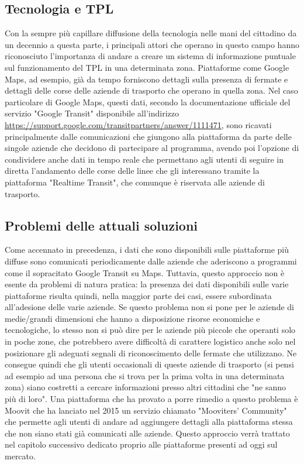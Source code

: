     \subsection{Tecnologia e TPL}
    Con la sempre più capillare diffusione della tecnologia nelle mani del cittadino da un decennio a questa parte, i principali attori che operano in questo campo hanno riconosciuto l'importanza di andare a creare un sistema di informazione puntuale sul funzionamento del TPL in una determinata zona. Piattaforme come Google Maps, ad esempio, già da tempo forniscono dettagli sulla presenza di fermate e dettagli delle corse delle aziende di trasporto che operano in quella zona. 
    Nel caso particolare di Google Maps, questi dati, secondo la documentazione ufficiale del servizio "Google Transit" disponibile all'indirizzo \url{https://support.google.com/transitpartners/answer/1111471}, sono ricavati principalmente dalle comunicazioni che giungono alla piattaforma da parte delle singole aziende che decidono di partecipare al programma, avendo poi l'opzione di condividere anche dati in tempo reale che permettano agli utenti di seguire in diretta l'andamento delle corse delle linee che gli interessano tramite la piattaforma "Realtime Transit", che comunque è riservata alle aziende di trasporto.

    \subsection{Problemi delle attuali soluzioni}
    Come accennato in precedenza, i dati che sono disponibili sulle piattaforme più diffuse sono comunicati periodicamente dalle aziende che aderiscono a programmi come il sopracitato Google Transit su Maps. 
    Tuttavia, questo approccio non è esente da problemi di natura pratica: la presenza dei dati disponibili sulle varie piattaforme risulta quindi, nella maggior parte dei casi, essere subordinata all'adesione delle varie aziende. Se questo problema non si pone per le aziende di medie/grandi dimensioni che hanno a disposizione risorse economiche e tecnologiche, lo stesso non si può dire per le aziende più piccole che operanti solo in poche zone, che potrebbero avere difficoltà di carattere logistico anche solo nel posizionare gli adeguati segnali di riconoscimento delle fermate che utilizzano.
    Ne consegue quindi che gli utenti occasionali di queste aziende di trasporto (si pensi ad esempio ad una persona che si trova per la prima volta in una determinata zona) siano costretti a cercare informazioni presso altri cittadini che "ne sanno più di loro".
    Una piattaforma che ha provato a porre rimedio a questo problema è Moovit che ha lanciato nel 2015 un servizio chiamato "Mooviters' Community" che permette agli utenti di andare ad aggiungere dettagli alla piattaforma stessa che non siano stati già comunicati alle aziende. Questo approccio verrà trattato nel capitolo successivo dedicato proprio alle piattaforme presenti ad oggi sul mercato. 

